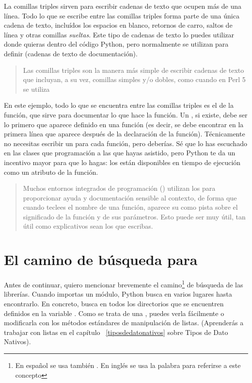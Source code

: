 La comillas triples sirven para escribir cadenas de texto que ocupen más de una línea. Todo lo que se escribe entre las comillas triples forma parte de una única cadena de texto, incluídos los espacios en blanco, retornos de carro, saltos de línea y otras comillas \emph{sueltas}. Este tipo de cadenas de texto lo puedes utilizar donde quieras dentro del código Python, pero normalmente se utilizan para definir  (cadenas de texto de documentación).

\begin{quote}
Las comillas triples son la manera más simple de escribir cadenas de texto que incluyan, a su vez, comillas simples y/o dobles, como cuando en Perl 5 se utiliza 
\end{quote}


En este ejemplo, todo lo que se encuentra entre las comillas triples es el  de la función, que sirve para documentar lo que hace la función. Un , si existe, debe ser lo primero que aparece definido en una función (es decir, se debe encontrar en la primera línea que aparece después de la declaración de la función). Técnicamente no necesitas escribir un  para cada función, pero deberías. Sé que lo has escuchado en las clases que programación a las que hayas asistido, pero Python te da un incentivo mayor para que lo hagas: los  están disponibles en tiempo de ejecución como un atributo de la función.

\begin{quote}
Muchos entornos integrados de programación () utilizan los  para proporcionar ayuda y documentación sensible al contexto, de forma que cuando teclees el nombre de una función, aparece su  como pista sobre el significado de la función y de sus parámetros. Esto puede ser muy útil, tan útil como explicativos sean los  que escribas.
\end{quote}

\section{El camino de búsqueda para }\label{sc:search_path}

Antes de continuar, quiero mencionar brevemente el camino\footnote{En español se usa también . En inglés se usa la palabra  para referirse a este concepto} de búsqueda de las librerías. Cuando importas un módulo, Python busca en varios lugares hasta encontrarlo. En concreto, busca en todos los directorios que se encuentren definidos en la variable . Como se trata de una , puedes verla fácilmente o modificarla con los métodos estándares de manipulación de listas. (Aprenderás a trabajar con listas en el capítulo ~\ref{tiposdedatonativos} sobre Tipos de Dato Nativos).

